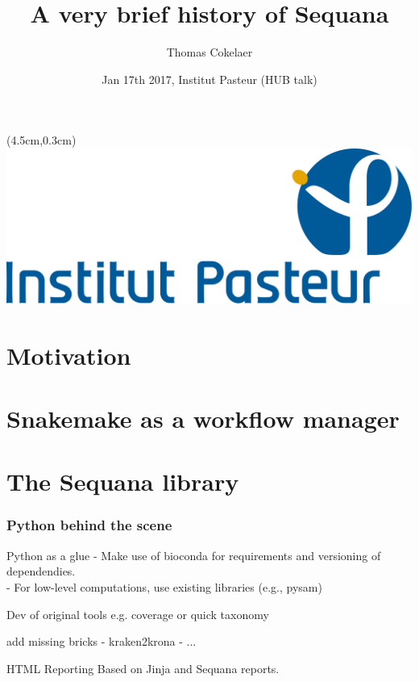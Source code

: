 \documentclass{beamer}
\title[Sequana]{A very brief history of Sequana}
\author[T. Cokelaer]{Thomas Cokelaer}
\institute{Institut Pasteur}
\date{Jan 17th 2017, Institut Pasteur (HUB talk)}
\begin{document}

\begin{frame}[plain]
    \titlepage
    \begin{textblock*}{5cm}(4.5cm,0.3cm)
        \includegraphics[scale=0.09]{images/Institut_Pasteur.png}
    \end{textblock*}
\end{frame}


\section{Motivation}





\section{Snakemake as a workflow manager}




\section{The Sequana library}

\begin{frame}
\frametitle{Python behind the scene}
 \begin{block}{Python as a glue}
     - Make use of bioconda for requirements and versioning of dependendies. \\
     - For low-level computations, use existing libraries (e.g., pysam)
 \end{block}
 
 \begin{block}{Dev of original tools}
  e.g. coverage or quick taxonomy 
 \end{block}
 
 \begin{block}{add missing bricks}
  - kraken2krona
  - ...
 \end{block}

 \begin{block}{HTML Reporting}
  Based on Jinja and Sequana reports.
 \end{block}
\end{frame}
\end{document}
